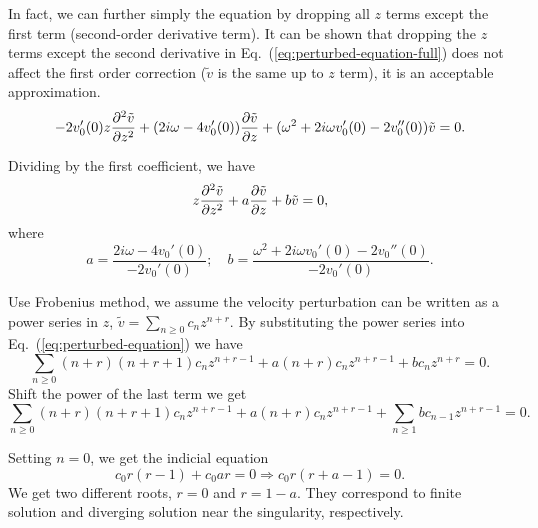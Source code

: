 In fact, we can further simply the equation by dropping all $z$ terms except the first term (second-order derivative term). It can be shown that dropping the $z$ terms except the second derivative in Eq.~(\ref{eq:perturbed-equation-full}) does not affect the first order correction ($\tilde{v}$ is the same up to $z$ term), it is an acceptable approximation.
\begin{equation}
	- 2v_0'(0)z\pdv[2]{\tilde{v}}{z}
	+ (2i\omega - 4v_0'(0))\pdv{\tilde{v}}{z}
	+ (\omega^2 + 2i\omega v_0'(0) - 2v_0''(0))\tilde{v}
	= 0.
\end{equation}

Dividing by the first coefficient, we have
\begin{equation}
	z\pdv[2]{\tilde{v}}{z} + a\pdv{\tilde{v}}{z} + b\tilde{v} = 0,
	\label{eq:perturbed-equation}
\end{equation}
where
\begin{equation}
	a = \frac{2i\omega - 4v_0'(0)}{-2v_0'(0)}; \quad
	b = \frac{\omega^2 + 2i\omega v_0'(0) - 2v_0''(0)}{-2v_0'(0)}.
\end{equation}

Use Frobenius method, we assume the velocity perturbation can be written as a power series in $z$,  $\tilde{v} = \sum_{n\geq 0}c_nz^{n+r}$. By substituting the power series into Eq.~(\ref{eq:perturbed-equation}) we have
\begin{equation}
	\sum_{n \geq 0} (n+r)(n+r+1) c_n z^{n+r-1} + a(n+r)c_nz^{n+r-1} + bc_nz^{n+r} = 0.
\end{equation}
Shift the power of the last term we get
\begin{equation}
	\sum_{n \geq 0} (n+r)(n+r+1) c_n z^{n+r-1} + a(n+r)c_nz^{n+r-1} + \sum_{n \geq 1} bc_{n-1}z^{n+r-1} = 0.
\end{equation}

Setting $n=0$, we get the indicial equation
\begin{equation}
	c_0 r(r-1) + c_0 ar = 0 \Rightarrow c_0r(r+a-1) = 0.
\end{equation}
We get two different roots, $r=0$ and $r=1-a$. They correspond to finite solution and diverging solution near the singularity, respectively.

